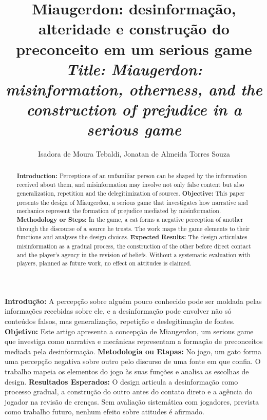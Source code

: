 \documentclass[12pt]{article}
\title{Miaugerdon: desinformação, alteridade e construção do preconceito em um serious game \\
\medskip
\small{
    \textit{Title: Miaugerdon: misinformation, otherness, and the construction of prejudice in a serious game}
}
}
\author{Isadora de Moura Tebaldi\inst{1}, Jonatan de Almeida Torres Souza\inst{1}}
\begin{document}
\maketitle

\thispagestyle{plain}

\begin{abstract}
\textbf{Introduction:} Perceptions of an unfamiliar person can be shaped by the information received about them, and misinformation may involve not only false content but also generalization, repetition and the delegitimization of sources.
\textbf{Objective:} This paper presents the design of Miaugerdon, a serious game that investigates how narrative and mechanics represent the formation of prejudice mediated by misinformation.
\textbf{Methodology or Steps:} In the game, a cat forms a negative perception of another through the discourse of a source he trusts. The work maps the game elements to their functions and analyses the design choices.
\textbf{Expected Results:} The design articulates misinformation as a gradual process, the construction of the other before direct contact and the player's agency in the revision of beliefs. Without a systematic evaluation with players, planned as future work, no effect on attitudes is claimed.
\end{abstract}


\begin{resumo}
\textbf{Introdução:} A percepção sobre alguém pouco conhecido pode ser moldada pelas informações recebidas sobre ele, e a desinformação pode envolver não só conteúdos falsos, mas generalização, repetição e deslegitimação de fontes.
\textbf{Objetivo:} Este artigo apresenta a concepção de Miaugerdon, um serious game que investiga como narrativa e mecânicas representam a formação de preconceitos mediada pela desinformação.
\textbf{Metodologia ou Etapas:} No jogo, um gato forma uma percepção negativa sobre outro pelo discurso de uma fonte em que confia. O trabalho mapeia os elementos do jogo às suas funções e analisa as escolhas de design.
\textbf{Resultados Esperados:} O design articula a desinformação como processo gradual, a construção do outro antes do contato direto e a agência do jogador na revisão de crenças. Sem avaliação sistemática com jogadores, prevista como trabalho futuro, nenhum efeito sobre atitudes é afirmado.
\end{resumo}

\end{document}
